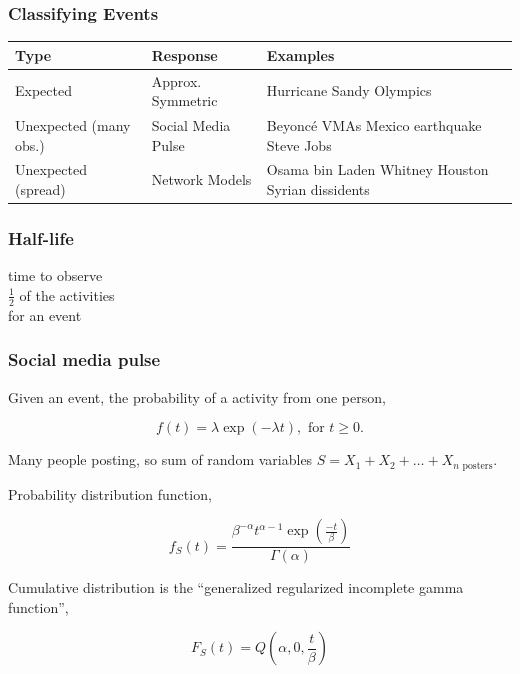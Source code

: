 \documentclass{beamer}
\begin{document}
\begin{frame}\frametitle{Classifying Events}
\begin{table}
\begin{tabular}{ m{2cm} | m{ 2.5cm} | m{4cm}}
\hline
Type & Response & Examples \\ \hline
Expected    & Approx. \newline Symmetric & Hurricane Sandy \newline Olympics \\ \hline
Unexpected (many obs.) & Social Media \newline Pulse & Beyonc\'{e} VMAs \newline  Mexico earthquake \newline  Steve Jobs \\ \hline
Unexpected (spread) & Network \newline Models & Osama bin Laden \newline  Whitney Houston \newline  Syrian dissidents \\ \hline
\end{tabular}
\end{table}
\end{frame}



\begin{frame}\frametitle{Half-life}
\begin{center}
{\Huge time to observe \\[6pt] $\frac{1}{2}$ of the activities \\[6pt] for an event}
\end{center}
\end{frame}

\begin{frame}
\frametitle{Social media pulse} 
Given an event, the probability of a activity from one person,

\begin{equation*}
f(t) = \lambda \exp(-\lambda t), \text{ for } t \geq 0.
\end{equation*}

Many people posting, so sum of random variables $S = X_1 + X_2 + \ldots + X_{n \text{ posters}}$.

Probability distribution function,

\begin{equation*}
f_S(t) = \frac{ \beta^{-\alpha} t^{\alpha-1} \exp( \frac{-t}{\beta}) } {\Gamma(\alpha)}
\end{equation*}

Cumulative distribution is the ``generalized regularized incomplete gamma function'',

\begin{equation*}
F_S(t) = Q(\alpha, 0, \frac{ t}{\beta})
\end{equation*}
\end{frame}
\end{document}
